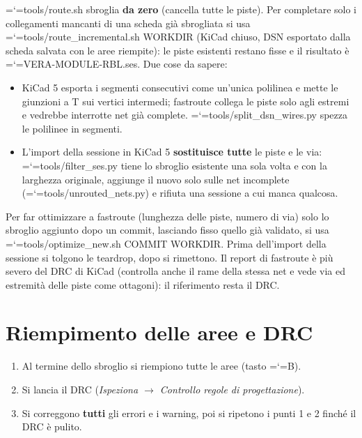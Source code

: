 \documentclass[11pt,a4paper]{article}
\makeatletter
\newcommand{\file}[1]{{\ttfamily\hyphenchar\font=`\-\relax\language=\l@nohyphenation #1}}
\makeatother
\begin{document}
\file{tools/route.sh} sbroglia \textbf{da zero} (cancella tutte le piste). Per
completare solo i collegamenti mancanti di una scheda già sbrogliata si usa
\file{tools/route\_incremental.sh WORKDIR} (KiCad chiuso, DSN esportato dalla
scheda salvata con le aree riempite): le piste esistenti restano fisse e il
risultato è \file{VERA-MODULE-RBL.ses}. Due cose da sapere:

\begin{itemize}[leftmargin=*]
  \item KiCad 5 esporta i segmenti consecutivi come un'unica polilinea e mette
    le giunzioni a T sui vertici intermedi; fastroute collega le piste solo agli
    estremi e vedrebbe interrotte net già complete.
    \file{tools/split\_dsn\_wires.py} spezza le polilinee in segmenti.
  \item L'import della sessione in KiCad 5 \textbf{sostituisce tutte} le piste e
    le via: \file{tools/filter\_ses.py} tiene lo sbroglio esistente una sola
    volta e con la larghezza originale, aggiunge il nuovo solo sulle net
    incomplete (\file{tools/unrouted\_nets.py}) e rifiuta una sessione a cui
    manca qualcosa.
\end{itemize}

Per far ottimizzare a fastroute (lunghezza delle piste, numero di via) solo lo
sbroglio aggiunto dopo un commit, lasciando fisso quello già validato, si usa
\file{tools/optimize\_new.sh COMMIT WORKDIR}. Prima dell'import della sessione
si tolgono le teardrop, dopo si rimettono. Il report di fastroute è più severo
del DRC di KiCad (controlla anche il rame della stessa net e vede via ed
estremità delle piste come ottagoni): il riferimento resta il DRC.

\section{Riempimento delle aree e DRC}

\begin{enumerate}[leftmargin=*]
  \item Al termine dello sbroglio si riempiono tutte le aree (tasto \file{B}).
  \item Si lancia il DRC (\emph{Ispeziona $\rightarrow$ Controllo regole di
        progettazione}).
  \item Si correggono \textbf{tutti} gli errori e i warning, poi si ripetono i
        punti 1 e 2 finché il DRC è pulito.
\end{enumerate}
\end{document}
